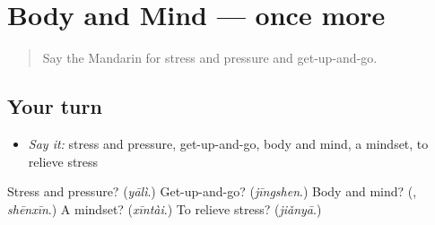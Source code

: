 \section[(dialogue)]{Body and Mind — once more}

\label{lesson:ZH-R485-review-final-485}



\begin{quote}
Say the Mandarin for stress and pressure and get-up-and-go.
\end{quote}

\subsection*{Your turn}
\begin{itemize}
\raggedright
  \item \emph{Say it:} stress and pressure, get-up-and-go, body and mind, a mindset, to relieve stress
\end{itemize}

\begin{tcolorbox}[breakable,colback=teal!4,colframe=teal!35!black,title={Before you move on}]
Stress and pressure? (\emph{yālì}.) Get-up-and-go? (\emph{jīngshen}.) Body and mind? (\textbf{}, \emph{shēnxīn}.) A mindset? (\emph{xīntài}.) To relieve stress? (\emph{jiǎnyā}.)
\end{tcolorbox}

